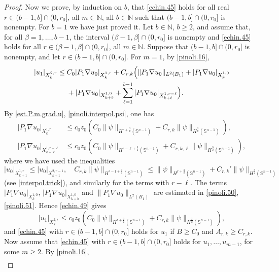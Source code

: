 \documentclass[10pt,reqno,a4paper]{article}
\numberwithin{equation}{section}
\theoremstyle{plain}
\theoremstyle{definition}
\newcommand{\N}{{\mathbb N}}
\renewcommand{\S}{{\mathbb S}}
\renewcommand{\b}{\beta}
\newcommand{\grad}{\nabla}
\begin{document}
\begin{proof}
Now we prove, by induction on $b$, 
that \eqref{echin.45} holds for all real $r \in (b-1, b] \cap (0,  r_0]$, 
all $m \in \N$, all $b \in \N$ such that $(b-1, b] \cap (0,  r_0]$ is nonempty.
For $b=1$ we have just proved it. 
Let $b \in \N$, $b \geq 2$, 
and assume that, for all $\b = 1, \ldots, b - 1$, 
the interval $(\b-1, \b] \cap (0, r_0]$ is nonempty 
and \eqref{echin.45} holds for all $r \in (\b-1, \b] \cap (0, r_0]$, all $m \in \N$. 
Suppose that $(b - 1, b] \cap (0, r_0]$ is nonempty, 
and let $r \in (b - 1, b] \cap (0, r_0]$. 
For $m=1$, by \eqref{pinoli.16}, 
\begin{align} 
|u_1|_{X^{2,r}_k} 
& \leq C_0 |P_1 \grad u_0|_{X^{1,r}_k}
+ C_{r,k} \Big( \| P_1 \grad u_0 \|_{L^2(B_1)}
+ |P_1 \grad u_0|_{X^{1,0}_k}
\notag \\ & \quad \ 
+ |P_1 \grad u_0|_{X^{1,0}_{k+b}}
+ \sum_{\ell=1}^{b-1} |P_1 \grad u_0|_{X^{1,r-\ell}_{k+\ell}} \Big).
\label{echin.49}
\end{align}
By \eqref{est.P.m.grad.u}, \eqref{pinoli.interpol.psi}, one has 
\begin{align*}
|P_1 \grad u_0|_{X^{1,r}_k} 
& \leq c_0 z_0 ( C_0 \| \psi \|_{H^{r + \frac32}(\S^{n-1})} 
+ C_{r,k} \| \psi \|_{H^{\frac32}(\S^{n-1})} ),
\\
|P_1 \grad u_0|_{X^{1, r - \ell}_{k+\ell}} 
& \leq c_0 z_0 ( C_0 \| \psi \|_{H^{r - \ell + \frac32}(\S^{n-1})} 
+ C_{r,k,\ell} \| \psi \|_{H^{\frac32}(\S^{n-1})} ),
\end{align*}
where we have used the inequalities  
\[
|u_0|_{X^{1,r}_{k+1}} 
\leq |u_0|_{X^{2,r-1}_{k+1}}, 
\quad 
C_{r,k} \| \psi \|_{H^{r - 1 + \frac32}(\S^{n-1})} 
\leq \| \psi \|_{H^{r + \frac32}(\S^{n-1})} + C_{r,k}' \| \psi \|_{H^{\frac32}(\S^{n-1})}
\]
(see \eqref{interpol.trick}), and similarly for the terms with $r - \ell$.
The terms $|P_1 \grad u_0|_{X^{1,0}_{k}}$, $|P_1 \grad u_0|_{X^{1,0}_{k+b}}$ 
and $\| P_1 \grad u_0 \|_{L^2(B_1)}$ are estimated in \eqref{pinoli.50}, \eqref{pinoli.51}.  
Hence \eqref{echin.49} gives
\begin{equation} \label{pinoli.60}
|u_1|_{X^{2,r}_k} 
\leq c_0 z_0 ( C_0 \| \psi \|_{H^{r + \frac32}(\S^{n-1})} 
+ C_{r,k} \| \psi \|_{H^{\frac32}(\S^{n-1})} ),
\end{equation}
and \eqref{echin.45} with $r \in (b-1,b] \cap (0, r_0]$ holds for $u_1$ 
if $B \geq C_0$ and $A_{r,k} \geq C_{r,k}$.  
Now assume that \eqref{echin.45} with $r \in (b - 1, b] \cap (0, r_0]$ 
holds for $u_1, \ldots, u_{m-1}$, for some $m \geq 2$. 
By \eqref{pinoli.16}, 
\begin{align*}

\end{align*}
\end{proof}
\end{document}
